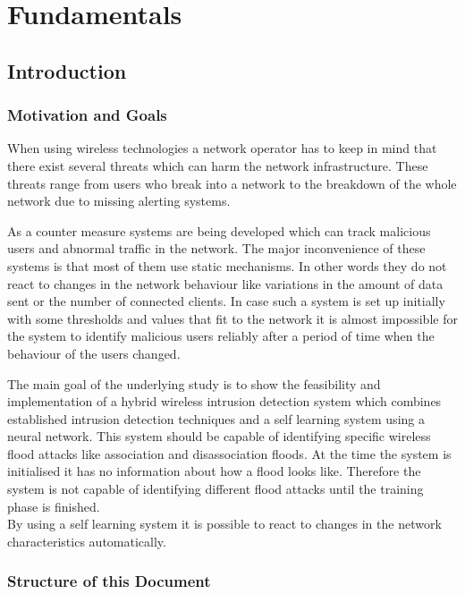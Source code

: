 
\part{Fundamentals}

\chapter{Introduction}

\section{Motivation and Goals}

When using wireless technologies a network operator has to keep in mind that there exist several threats which can harm the network infrastructure. These threats range from users who break into a network to the breakdown of the whole network due to missing alerting systems.

As a counter measure systems are being developed which can track malicious users and abnormal traffic in the network. The major inconvenience of these systems is that most of them use static mechanisms. In other words they do not react to changes in the network behaviour like variations in the amount of data sent or the number of connected clients. In case such a system is set up initially with some thresholds and values that fit to the network it is almost impossible for the system to identify malicious users reliably after a period of time when the behaviour of the users changed.

The main goal of the underlying study is to show the feasibility and implementation of a hybrid wireless intrusion detection system which combines established intrusion detection techniques and a self learning system using a neural network. This system should be capable of identifying specific wireless flood attacks like association and disassociation floods. At the time the system is initialised it has no information about how a flood looks like. Therefore the system is not capable of identifying different flood attacks until the training phase is finished.\\

By using a self learning system it is possible to react to changes in the network characteristics automatically.

\section{Structure of this Document}

